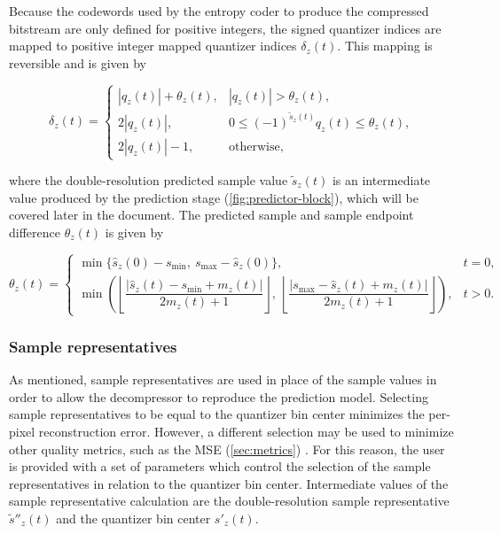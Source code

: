 Because the codewords used by the entropy coder to produce the compressed bitstream are only defined for positive integers, the signed quantizer indices are mapped to positive integer mapped quantizer indices $\delta_z(t)$. This mapping is reversible and is given by

\begin{equation}
	\delta_z(t) =
	\begin{cases}
		|q_z(t)| + \theta_z(t), & |q_z(t)| > \theta_z(t),                             \\
		2|q_z(t)|,              & 0 \le (-1)^{\tilde{s}_z(t)} q_z(t) \le \theta_z(t), \\
		2|q_z(t)| - 1,          & \text{otherwise},
	\end{cases}
	\label{eq:mqi}
\end{equation}

where the double-resolution predicted sample value $\tilde{s}_z(t)$ is an intermediate value produced by the prediction stage (\autoref{fig:predictor-block}), which will be covered later in the document. The predicted sample and sample endpoint difference $\theta_z(t)$ is given by

\begin{equation}
	\theta_z(t) =
	\begin{cases}
		\min\{\hat{s}_z(0) - s_{\min},\ s_{\max} - \hat{s}_z(0)\}, & t = 0, \\
		\min\left(
		\left\lfloor \dfrac{|\hat{s}_z(t) - s_{\min} + m_z(t)|}{2m_z(t) + 1} \right\rfloor,\
		\left\lfloor \dfrac{|s_{\max} - \hat{s}_z(t) + m_z(t)|}{2m_z(t) + 1} \right\rfloor
		\right),                                                   & t > 0.
	\end{cases}
	\label{eq:theta}
\end{equation}

\subsubsection{Sample representatives}

As mentioned, sample representatives are used in place of the sample values in order to allow the decompressor to reproduce the prediction model. Selecting sample representatives to be equal to the quantizer bin center minimizes the per-pixel reconstruction error. However, a different selection may be used to minimize other quality metrics, such as the \acrfull{MSE} (\autoref{sec:metrics}) \cite{LosslessMultispectralHyperspectral2022}. For this reason, the user is provided with a set of parameters which control the selection of the sample representatives in relation to the quantizer bin center. Intermediate values of the sample representative calculation are the double-resolution sample representative $\tilde{s}''_z(t)$ and the quantizer bin center $s'_z(t)$.

